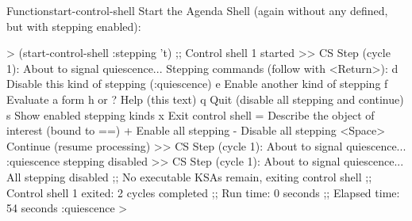 \documentclass[10pt,twoside,english,pdftex]{article}
\begin{document}
\begin{functiondoc}{Function}{start-control-shell}
Start the Agenda Shell (again without any  defined, but with
stepping enabled):
%
\W\supp
\begin{example}
  > (start-control-shell :stepping 't)
  ;; Control shell 1 started
  >> CS Step (cycle 1):
     About to signal quiescence... 
  Stepping commands (follow with <Return>):
     d       Disable this kind of stepping (:quiescence)
     e       Enable another kind of stepping
     f       Evaluate a form
     h or ?  Help (this text)
     q       Quit (disable all stepping and continue)
     s       Show enabled stepping kinds
     x       Exit control shell
     =       Describe the object of interest (bound to ==)
     +       Enable all stepping
     -       Disable all stepping
     <Space> Continue (resume processing)
  >> CS Step (cycle 1):
     About to signal quiescence... 
  :quiescence stepping disabled
  >> CS Step (cycle 1):
     About to signal quiescence... 
  All stepping disabled
  ;; No executable KSAs remain, exiting control shell
  ;; Control shell 1 exited: 2 cycles completed
  ;; Run time: 0 seconds
  ;; Elapsed time: 54 seconds
  :quiescence
  >
\end{example}

%
\fnnote \pollingnote

\end{functiondoc}

\end{document}
